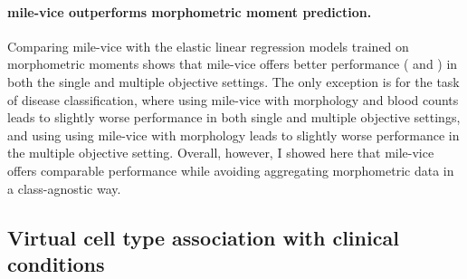 \begin{figure}[!ht]
    \label{fig:mile-vice-roc-curves}
\end{figure}

\paragraph{\Ac{mile-vice} outperforms morphometric moment prediction.} Comparing \ac{mile-vice} with the elastic linear regression models trained on morphometric moments shows that \ac{mile-vice} offers better performance ( and ) in both the single and multiple objective settings. The only exception is for the task of disease classification, where using \ac{mile-vice} with morphology and blood counts leads to slightly worse performance in both single and multiple objective settings, and using using \ac{mile-vice} with morphology leads to slightly worse performance in the multiple objective setting. Overall, however, I showed here that \ac{mile-vice} offers comparable performance while avoiding aggregating morphometric data in a class-agnostic way. 

\begin{figure}[!ht]
    \label{fig:mile-vice-vs-glmnet}
\end{figure}

\begin{figure}[!ht]
    \label{fig:mile-vice-vs-glmnet-scatter}
\end{figure}

\subsection{Virtual cell type association with clinical conditions}

